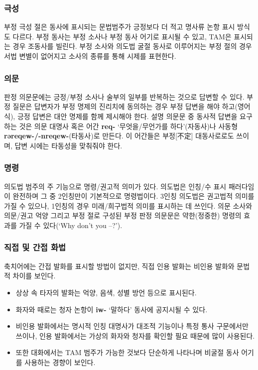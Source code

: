 \subsubsection{극성}
부정 극성 절은 동사에 표시되는 문법범주가 긍정보다 더 적고 명사류 논항 표시 방식도 다르다. 부정 동사는 부정 소사나 부정 동사 어기로 표시될 수 있고, TAM은 표시되는 경우 조동사를 빌린다. 부정 소사와 의도법 굴절 동사로 이루어지는 부정 절의 경우 서법 변별이 없어지고 소사의 종류를 통해 시제를 표현한다.
\subsubsection{의문}
판정 의문문에는 긍정/부정 소사나 술부의 일부를 반복하는 것으로 답변할 수 있다. 부정 질문은 답변자가 부정 명제의 진리치에 동의하는 경우 부정 답변을 해야 하고(영어식), 긍정 답변은 대안 명제를 함께 제시해야 한다. 설명 의문문 중 동사적 답변을 요구하는 것은 의문 대명사 혹은 어간 \textbf{req-} `무엇을/무언가를 하다'(자동사)나 사동형 \textbf{rəreqew-/-nreqew-}(타동사)로 만든다. 이 어간들은 부정[不定] 대동사로로도 쓰이며, 답변 시에는 타동성을 맞춰줘야 한다.
\subsubsection{명령}
의도법 범주의 주 기능으로 명령/권고적 의미가 있다. 의도법은 인칭/수 표시 패러다임이 완전하며 그 중 2인칭만이 기본적으로 명령법이다. 3인칭 의도법은 권고법적 의미를 가질 수 있으나, 1인칭의 경우 미래/희구법적 의미를 표시하는 데 쓰인다. 의문 소사와 의문/권고 억양 그리고 부정 절로 구성된 부정 판정 의문문은 약한(정중한) 명령의 효과를 가질 수 있다(`Why don't you --?').
\subsubsection{직접 및 간접 화법}
축치어에는 간접 발화를 표시할 방법이 없지만, 직접 인용 발화는 비인용 발화와 문법적 차이를 보인다.
\begin{itemize}
	\item 상상 속 타자의 발화는 억양, 음색, 성별 방언 등으로 표시된다.
	\item 화자와 때로는 청자 논항이 \textbf{iw-} `말하다' 동사에 공지시될 수 있다.
	\item 비인용 발화에서는 명시적 인칭 대명사가 대조적 기능이나 특정 통사 구문에서만 쓰이나, 인용 발화에서는 가상의 화자와 청자를 확인할 필요 때문에 많이 사용된다.
	\item 또한 대화에서는 TAM 범주가 가능한 것보다 단순하게 나타나며 비굴절 동사 어기를 사용하는 경향이 보인다.
\end{itemize}

